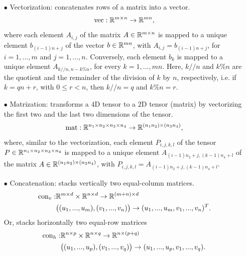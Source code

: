 \begin{itemize}
  \item[$\bullet$] Vectorization: concatenates rows of a matrix into a vector.
  \begin{equation*}
    \text{vec}: \mathbb R^{m \times n} \to \mathbb R^{m n},
  \end{equation*}
  where each element $A_{i,j}$ of the matrix $A \in \mathbb R^{m \times n}$ is
  mapped to a unique element $b_{(i-1)n + j}$ of the vector
  $b \in \mathbb R^{m n}$, with $A_{i,j} = b_{(i-1)n + j}$, for $i = 1, ..., m$ and $j = 1, ...,n$.
  Conversely, each element $b_k$ is mapped to a unique element $A_{k // n, n - k \% n}$,
  for every $k = 1, ..., mn$. Here, $k // n$ and $k \% n$ are the quotient and
  the remainder of the division of $k$ by $n$,
  respectively, i.e. if $k = q n + r$, with $0 \leq r < n$, then $k // n = q$ and $k \% n = r$.

  \item[$\bullet$] Matrization: transforms a $4$D tensor to a $2$D tensor (matrix) by
  vectorizing the first two and the last two dimensions of the tensor.
  \begin{equation*}
    \text{mat}: \mathbb R^{n_1 \times n_2 \times n_3 \times n_4} \to \mathbb R^{(n_1 n_2) \times (n_3 n_4)},
  \end{equation*}
  where, similar to the vectorization, each element $P_{i,j,k,l}$ of the tensor
  $P \in \mathbb R^{n_1 \times n_2 \times n_3 \times n_4}$ is mapped to
  a unique element $A_{(i-1)n_2 + j, (k-1)n_4 + l}$ of the
  matrix $A \in \mathbb R^{(n_1 n_2) \times (n_3 n_4)}$,
  with $P_{i,j,k,l} = A_{(i-1)n_2 + j, (k-1)n_4 + l}$.

  \item[$\bullet$] Concatenation: stacks vertically two equal-column matrices.
  \begin{equation*}
    \begin{split}
      \text{con}_v: &\mathbb R^{m \times d} \times \mathbb R^{n \times d} \to \mathbb R^{(m+n) \times d} \\
      & \big( (u_1, ..., u_m),(v_1, ..., v_n) \big) \to (u_1, ..., u_m, v_1, ..., v_n)^T.
    \end{split}
  \end{equation*}
  Or, stacks horizontally two equal-row matrices
  \begin{equation*}
    \begin{split}
      \text{con}_h: &\mathbb R^{n \times p} \times \mathbb R^{n \times q} \to \mathbb R^{n \times (p+q)} \\
      & \big( (u_1, ..., u_p),(v_1, ..., v_q) \big) \to (u_1, ..., u_p, v_1, ..., v_q).
    \end{split}
  \end{equation*}
\end{itemize}
